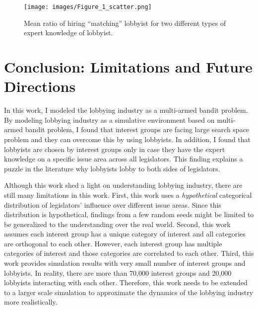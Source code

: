 \documentclass{article}
\begin{document}
\begin{figure}[h!]
    \centering
    \texttt{[image: images/Figure\_1\_scatter.png]}
    \caption{Mean ratio of hiring ``matching'' lobbyist for two different types of expert knowledge of lobbyist.}
    \label{fig:specialization}
\end{figure}

\section{Conclusion: Limitations and Future Directions}

In this work, 
I modeled the lobbying industry as a multi-armed bandit problem.
By modeling lobbying industry as a simulative environment based on 
multi-armed bandit problem, I found that 
interest groups are facing large search space problem 
and they can overcome this by using lobbyists.
In addition, I found that lobbyists are chosen 
by interest groups 
only in case they have the expert knowledge on a specific issue area across all legislators.
This finding explains a puzzle in the literature why lobbyists lobby to both sides of legislators.

Although this work shed a light on understanding lobbying industry, 
there are still many limitations in this work. First, this work 
uses a \textit{hypothetical} categorical distribution of 
legislators' influence over different issue areas.
Since this distribution is hypothetical,
findings from a few random seeds might be limited to 
be generalized to the understanding over the real world.
Second, this work assumes each interest group has a unique 
category of interest and all categories are orthogonal to each other.
However, each 
interest group has multiple categories of interest and 
those categories are correlated to each other. 
Third, this work provides simulation results with 
very small number of interest groups and lobbyists. In reality,
there are more than 70,000 interest groups and 20,000 lobbyists interacting with each other.
Therefore, this work needs to be extended to a larger scale simulation 
to approximate the dynamics of the lobbying industry more realistically.
\end{document}
